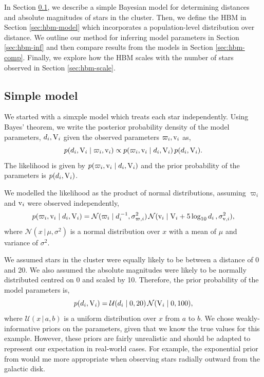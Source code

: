 In Section \ref{sec:simple-model}, we describe a simple Bayesian model for determining distances and absolute magnitudes of stars in the cluster. Then, we define the HBM in Section \ref{sec:hbm-model} which incorporates a population-level distribution over distance. We outline our method for inferring model parameters in Section \ref{sec:hbm-inf} and then compare results from the models in Section \ref{sec:hbm-comp}. Finally, we explore how the HBM scales with the number of stars observed in Section \ref{sec:hbm-scale}.

\subsection{Simple model}\label{sec:simple-model}

We started with a simxple model which treats each star independently. Using Bayes' theorem, we write the posterior probability density of the model parameters, \(d_i, \mathrm{V}_i\) given the observed parameters \(\varpi_i, \mathrm{v}_i\) as,
%
\begin{equation}
    p(d_i, \mathrm{V}_i \mid \varpi_i, \mathrm{v}_i) \propto p(\varpi_i, \mathrm{v}_i \mid d_i, \mathrm{V}_i) \, p(d_i, \mathrm{V}_i).
\end{equation}
%
The likelihood is given by \(p(\varpi_i, \mathrm{v}_i \mid d_i, \mathrm{V}_i)\) and the prior probability of the parameters is \(p(d_i, \mathrm{V}_i)\).

We modelled the likelihood as the product of normal distributions, assuming \(\varpi_i\) and \(\mathrm{v}_i\) were observed independently,
%
\begin{equation}
    p(\varpi_i, \mathrm{v}_i \mid d_i, \mathrm{V}_i) = \mathcal{N}(\varpi_i \mid d_i^{\,-1}, \sigma_{\varpi, i}^2) \, \mathcal{N}(\mathrm{v}_i \mid \mathrm{V}_i + 5\log_{10}d_i \, , \sigma_{\mathrm{v}, i}^2),\label{eq:hbm-like}
\end{equation}
%
where \(\mathcal{N}(x \,|\, \mu, \sigma^2)\) is a normal distribution over \(x\) with a mean of \(\mu\) and variance of \(\sigma^2\).

We assumed stars in the cluster were equally likely to be between a distance of 0 and 20. We also assumed the absolute magnitudes were likely to be normally distributed centred on 0 and scaled by 10. Therefore, the prior probability of the model parameters is,
%
\begin{equation}
    p(d_i, \mathrm{V}_i) = \mathcal{U}(d_i \mid 0, 20) \, \mathcal{N}(\mathrm{V}_i \mid 0, 100),
\end{equation}
%
where \(\mathcal{U}(x \,|\, a, b)\) is a uniform distribution over \(x\) from \(a\) to \(b\). We chose weakly-informative priors on the parameters, given that we know the true values for this example. However, these priors are fairly unrealistic and should be adapted to represent our expectation in real-world cases. For example, the exponential prior from \citet{Bailer-Jones.Rybizki.ea2018} would me more appropriate when observing stars radially outward from the galactic disk.

